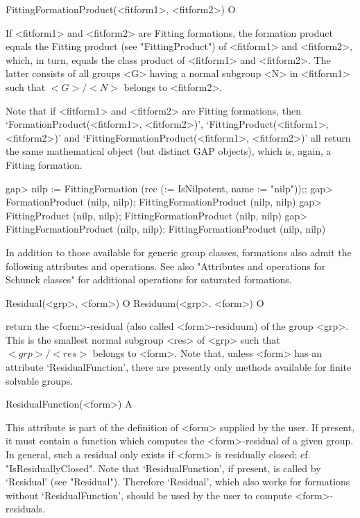 \>FittingFormationProduct(<fitform1>, <fitform2>) O

If <fitform1> and <fitform2>  are Fitting formations, the formation product
equals the Fitting product (see "FittingProduct") of <fitform1> and
<fitform2>, which, in turn, equals the class product of <fitform1> and
<fitform2>. The latter consists of all groups <G> having a  normal subgroup
<N> in <fitform1> such that $<G>/<N>$ belongs to <fitform2>.

Note that if <fitform1> and <fitform2> are Fitting formations, then 
`FormationProduct(<fitform1>, <fitform2>)', `FittingProduct(<fitform1>,
<fitform2>)' and `FittingFormationProduct(<fitform1>, <fitform2>)' all
return the same mathematical object (but distinct GAP objects), which is,
again, a Fitting formation.


\beginexample
gap> nilp := FittingFormation (rec (\in := IsNilpotent, name := "nilp"));;
gap> FormationProduct (nilp, nilp);
FittingFormationProduct (nilp, nilp)
gap> FittingProduct (nilp, nilp);
FittingFormationProduct (nilp, nilp)
gap> FittingFormationProduct (nilp, nilp);
FittingFormationProduct (nilp, nilp)
\endexample


\null


In addition to those available for generic group classes, formations also
admit the following attributes and operations. See also "Attributes and
operations for Schunck classes" for additional operations for saturated
formations. 

\>Residual(<grp>, <form>) O
\>Residuum(<grp>. <form>) O

return the <form>-residual (also called <form>-residuum) of the group <grp>.
This is the smallest normal subgroup <res> of <grp> such that $<grp>/<res>$ belongs to <form>.
Note that, unless <form> has an attribute `ResidualFunction', there are presently only methods
available for finite solvable groups.

\>ResidualFunction(<form>) A

This attribute is part of the definition of <form> supplied by the user. If
present, it must contain a function which computes the <form>-residual of a given group.
In general, such a residual only exists if <form> is residually closed; cf.
"IsResiduallyClosed". Note that `ResidualFunction', if present, is called by `Residual'
(see "Residual"). Therefore `Residual', which also works for formations without
`ResidualFunction', should be used by the user to compute <form>-residuals.

